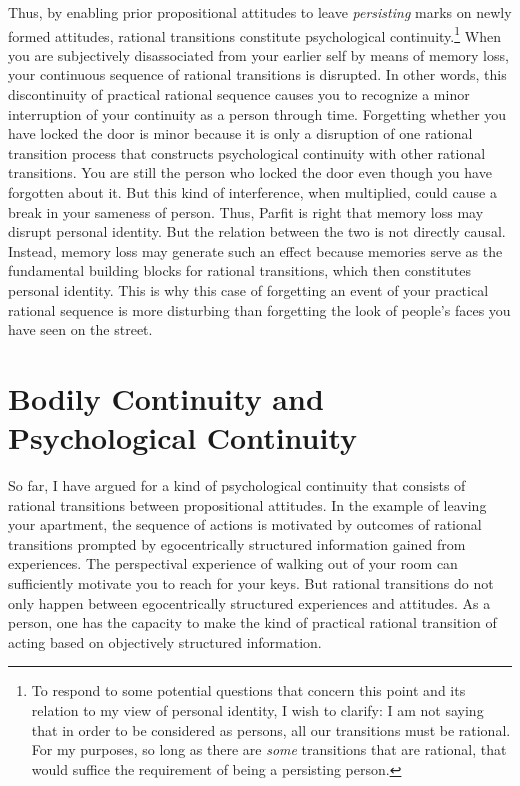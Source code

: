 Thus, by enabling prior propositional attitudes to leave
\emph{persisting} marks on newly formed attitudes, rational transitions
constitute psychological continuity.\footnote{To respond to some
  potential questions that concern this point and its relation to my
  view of personal identity, I wish to clarify: I am not saying that in
  order to be considered as persons, all our transitions must be
  rational. For my purposes, so long as there are \emph{some}
  transitions that are rational, that would suffice the requirement of
  being a persisting person.} When you are subjectively disassociated
from your earlier self by means of memory loss, your continuous sequence
of rational transitions is disrupted. In other words, this discontinuity
of practical rational sequence causes you to recognize a minor
interruption of your continuity as a person through time. Forgetting
whether you have locked the door is minor because it is only a
disruption of one rational transition process that constructs
psychological continuity with other rational transitions. You are still
the person who locked the door even though you have forgotten about it.
But this kind of interference, when multiplied, could cause a break in
your sameness of person. Thus, Parfit is right that memory loss may
disrupt personal identity. But the relation between the two is not
directly causal. Instead, memory loss may generate such an effect
because memories serve as the fundamental building blocks for rational
transitions, which then constitutes personal identity. This is why this
case of forgetting an event of your practical rational sequence is more
disturbing than forgetting the look of people's faces you have seen on
the street.

\section{Bodily Continuity and Psychological Continuity }

So far, I have argued for a kind of psychological continuity that
consists of rational transitions between propositional attitudes. In the
example of leaving your apartment, the sequence of actions is motivated
by outcomes of rational transitions prompted by egocentrically
structured information gained from experiences. The perspectival
experience of walking out of your room can sufficiently motivate you to
reach for your keys. But rational transitions do not only happen between
egocentrically structured experiences and attitudes. As a person, one
has the capacity to make the kind of practical rational transition of
acting based on objectively structured information.

